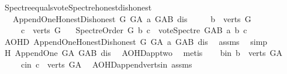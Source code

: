 \begin{isabellebody}
%
\isadelimproof
\isanewline
%
\endisadelimproof
\isanewline
\isanewline
{}\isamarkupfalse%
\ Spectre{\isacharunderscore}{\kern0pt}equals{\isacharunderscore}{\kern0pt}vote{\isacharunderscore}{\kern0pt}Spectre{\isacharunderscore}{\kern0pt}honest{\isacharunderscore}{\kern0pt}dishonest{\isacharcolon}{\kern0pt}\isanewline
\ \ \ {\isachardoublequoteopen}Append{\isacharunderscore}{\kern0pt}One{\isacharunderscore}{\kern0pt}Honest{\isacharunderscore}{\kern0pt}Dishonest\ G\ G{\isacharunderscore}{\kern0pt}A\ a\ G{\isacharunderscore}{\kern0pt}AB\ dis{\isachardoublequoteclose}\isanewline
\ \ \ \ \ {\isachardoublequoteopen}b\ {\isasymin}\ verts\ G{\isachardoublequoteclose}\isanewline
\ \ \ \ \ {\isachardoublequoteopen}c\ {\isasymin}\ verts\ G{\isachardoublequoteclose}\isanewline
\ \ \ {\isachardoublequoteopen}Spectre{\isacharunderscore}{\kern0pt}Order\ G\ b\ c\ {\isasymlongleftrightarrow}\ vote{\isacharunderscore}{\kern0pt}Spectre\ G{\isacharunderscore}{\kern0pt}AB\ a\ b\ c\ {\isacharequal}{\kern0pt}\ {}{\isachardoublequoteclose}\isanewline
%
\isadelimproof
%
\endisadelimproof
%
\isatagproof
{}\isamarkupfalse%
\ {\isacharminus}{\kern0pt}\isanewline
\ \ \isamarkupfalse%
\ AOHD{\isacharcolon}{\kern0pt}\ Append{\isacharunderscore}{\kern0pt}One{\isacharunderscore}{\kern0pt}Honest{\isacharunderscore}{\kern0pt}Dishonest\ G\ G{\isacharunderscore}{\kern0pt}A\ a\ G{\isacharunderscore}{\kern0pt}AB\ dis\ \isamarkupfalse%
\ assms{\isacharparenleft}{\kern0pt}{}{\isacharparenright}{\kern0pt}\ \isamarkupfalse%
\ simp\isanewline
\ \ \isamarkupfalse%
\ H{}{\isacharcolon}{\kern0pt}\ Append{\isacharunderscore}{\kern0pt}One\ G{\isacharunderscore}{\kern0pt}A\ G{\isacharunderscore}{\kern0pt}AB\ dis\ \isamarkupfalse%
\ AOHD{\isachardot}{\kern0pt}app{\isacharunderscore}{\kern0pt}two\ \isamarkupfalse%
\ metis\isanewline
\ \ \isamarkupfalse%
\ b{\isacharunderscore}{\kern0pt}in{\isacharcolon}{\kern0pt}\ {\isachardoublequoteopen}b\ {\isasymin}\ verts\ G{\isacharunderscore}{\kern0pt}A{\isachardoublequoteclose}\ \isanewline
\ \ \ \ \ c{\isacharunderscore}{\kern0pt}in{\isacharcolon}{\kern0pt}\ {\isachardoublequoteopen}c\ {\isasymin}\ verts\ G{\isacharunderscore}{\kern0pt}A{\isachardoublequoteclose}\ \isamarkupfalse%
\ AOHD{\isachardot}{\kern0pt}append{\isacharunderscore}{\kern0pt}verts{\isacharunderscore}{\kern0pt}in\ assms{\isacharparenleft}{\kern0pt}{}{\isacharcomma}{\kern0pt}{}{\isacharparenright}{\kern0pt}\ \isamarkupfalse%

\end{isabellebody}
